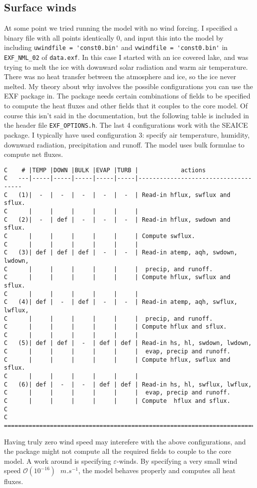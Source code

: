 \documentclass[11pt]{article}
\begin{document}
\subsection{Surface winds}
\label{sec:epsilonWinds}
At some point we tried running the model with no wind forcing. I specified a binary file with all points identically 0, and input this into the model by including \verb|uwindfile = 'const0.bin'| and \verb|vwindfile = 'const0.bin'| in \verb|EXF_NML_02| of \verb|data.exf|. In this case I started with an ice covered lake, and was trying to melt the ice with downward solar radiation and warm air temperature. There was no heat transfer between the atmosphere and ice, so the ice never melted. My theory about why involves the possible configurations you can use the EXF package in. The package needs certain combinations of fields to be specified to compute the heat fluxes and other fields that it couples to the core model. Of course this isn't said in the documentation, but the following table is included in the header file \verb|EXF_OPTIONS.h|. The last 4 configurations work with the SEAICE package. I typically have used configuration 3: specify air temperature, humidity, downward radiation, precipitation and runoff. The model uses bulk formulae to compute net fluxes.

\begin{lstlisting}[caption={Available configurations for running the EXF package}]
C    # |TEMP |DOWN |BULK |EVAP |TURB |            actions
C   ---|-----|-----|-----|-----|-----|-------------------------------------
C   (1)|  -  |  -  |  -  |  -  |  -  | Read-in hflux, swflux and sflux.
C      |     |     |     |     |     |
C   (2)|  -  | def |  -  |  -  |  -  | Read-in hflux, swdown and sflux.
C      |     |     |     |     |     | Compute swflux.
C      |     |     |     |     |     |
C   (3)| def | def | def |  -  |  -  | Read-in atemp, aqh, swdown, lwdown,
C      |     |     |     |     |     |  precip, and runoff.
C      |     |     |     |     |     | Compute hflux, swflux and sflux.
C      |     |     |     |     |     |
C   (4)| def |  -  | def |  -  |  -  | Read-in atemp, aqh, swflux, lwflux,
C      |     |     |     |     |     |  precip, and runoff.
C      |     |     |     |     |     | Compute hflux and sflux.
C      |     |     |     |     |     |
C   (5)| def | def |  -  | def | def | Read-in hs, hl, swdown, lwdown,
C      |     |     |     |     |     |  evap, precip and runoff.
C      |     |     |     |     |     | Compute hflux, swflux and sflux.
C      |     |     |     |     |     |
C   (6)| def |  -  |  -  | def | def | Read-in hs, hl, swflux, lwflux,
C      |     |     |     |     |     |  evap, precip and runoff.
C      |     |     |     |     |     | Compute  hflux and sflux.
C
C   =======================================================================
\end{lstlisting}
Having truly zero wind speed may interefere with the above configurations, and the package might not compute all the required fields to couple to the core model. A work around is specifying $\varepsilon$-winds. By specifying a very small wind speed $\mathcal{O}(10^{-16}) \textrm{ } \si{m.s^{-1}}$, the model behaves properly and computes all heat fluxes.
\end{document}
